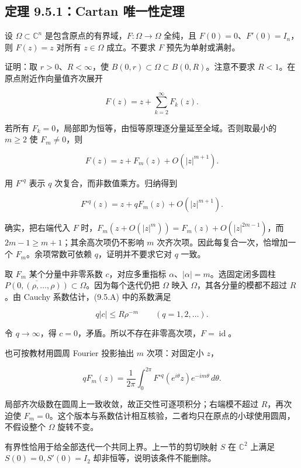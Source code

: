 \documentclass[11pt,a4paper]{article}
\begin{document}
\subsection{定理 9.5.1：Cartan 唯一性定理}\label{ch09-s5-heading-2}

设 \(\Omega\subset\mathbb C^n\)
是包含原点的有界域，\(F:\Omega\to\Omega\) 全纯，且
\(F(0)=0\)、\(F'(0)=I_n\)，则 \(F(z)=z\) 对所有 \(z\in\Omega\)
成立。不要求 \(F\) 预先为单射或满射。

证明：取 \(r>0\)、\(R<\infty\)，使
\(B(0,r)\subset\Omega\subset B(0,R)\)。注意不要求
\(R<1\)。在原点附近作向量值齐次展开

\[
F(z)=z+\sum_{k=2}^\infty F_k(z).
\]

若所有 \(F_k=0\)，局部即为恒等，由恒等原理逐分量延至全域。否则取最小的
\(m\ge2\) 使 \(F_m\ne0\)，则

\[
F(z)=z+F_m(z)+O(|z|^{m+1}).
\]

用 \(F^{\circ q}\) 表示 \(q\) 次复合，而非数值乘方。归纳得到

\[
F^{\circ q}(z)=z+qF_m(z)+O(|z|^{m+1}).
\tag{9.5.A}
\]

确实，把右端代入 \(F\) 时，\(F_m(z+O(|z|^m))=F_m(z)+O(|z|^{2m-1})\)，而
\(2m-1\ge m+1\)；其余高次项仍不影响 \(m\)
次齐次项。因此每复合一次，恰增加一个 \(F_m\)。余项常数可依赖
\(q\)，证明并不要求它对 \(q\) 一致。

取 \(F_m\) 某个分量中非零系数 \(c\)，对应多重指标
\(\alpha\)、\(|\alpha|=m\)。选固定闭多圆柱
\(\overline{P(0,(\rho,\ldots,\rho))}\subset\Omega\)。因为每个迭代仍把
\(\Omega\) 映入 \(\Omega\)，其各分量的模都不超过 \(R\)。由 Cauchy
系数估计，(9.5.A) 中的系数满足

\[
q|c|\le R\rho^{-m}\qquad(q=1,2,\ldots).
\]

令 \(q\to\infty\)，得
\(c=0\)，矛盾。所以不存在非零高次项，\(F=\operatorname{id}\)。

也可按教材用圆周 Fourier 投影抽出 \(m\) 次项：对固定小 \(z\)，

\[
qF_m(z)=\frac1{2\pi}\int_0^{2\pi}
F^{\circ q}(e^{i\theta}z)e^{-im\theta}\,d\theta.
\]

局部齐次级数在圆周上一致收敛，故正交性可逐项积分；右端模不超过
\(R\)，再次迫使
\(F_m=0\)。这个版本与系数估计相互核验，二者均只在原点的小球使用圆周，不假设整个
\(\Omega\) 旋转不变。

有界性恰用于给全部迭代一个共同上界。上一节的剪切映射 \(S\) 在
\(\mathbb C^2\) 上满足 \(S(0)=0,S'(0)=I_2\)
却非恒等，说明该条件不能删除。

\end{document}
